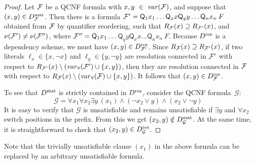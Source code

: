 \documentclass{llncs}
\newcommand{\longversion}[1]{#1}
\newcommand{\GGG}{\mathcal{G}} \newcommand{\HHH}{\mathcal{H}}
\newcommand{\Dres}{D^{\text{\normalfont res}}}
\newcommand{\Dmat}{D^{\text{\normalfont mat}}}
\begin{document}
\longversion{\begin{proof}
  Let $\mathcal{F}$ be a QCNF formula with $x,y~\in~\mathit{var}(\mathcal{F})$, and suppose that
  $(x,y) \in \Dmat_{\FFF}$. Then there is a formula $\mathcal{F}' = \mathsf{Q}_1
  x_1 \dots \mathsf{Q}_x x \mathsf{Q}_y y \dots \mathsf{Q}_n x_n\:F$ obtained
  from $\mathcal{F}$ by quantifier reordering, such that $R_{\mathcal{F}}(x) \supseteq
  R_{\mathcal{F}'}(x)$, and $\nu(\mathcal{F}') \neq \nu(\mathcal{F}'')$, where $\mathcal{F}''=
  \mathsf{Q}_1 x_1 \dots$\hskip 0pt$ \mathsf{Q}_y y \mathsf{Q}_x x
  \dots$\hskip 0pt$ \mathsf{Q}_n x_n\:F$. Because $\Dres$ is a dependency
  scheme, we must have $(x,y) \in \Dres_{\FFF'}$. Since $R_{\mathcal{F}}(x)
  \supseteq R_{\mathcal{F}'}(x)$, if two literals $\ell_x \in \{x,\neg x\}$ and
  $\ell_y \in \{y, \neg y\}$ are resolution connected in $\mathcal{F}'$ with respect
  to $R_{\mathcal{F}'}(x) \setminus (\mathit{var}_{\forall}(\mathcal{F}') \cup \{x,y\})$, then they
  are resolution connected in $\mathcal{F}$ with respect to $R_{\mathcal{F}}(x) \setminus
  (\mathit{var}_{\forall}(\mathcal{F}) \cup \{x,y\})$. It follows that $(x,y) \in
  \Dres_{\FFF}$.

  To see that $\Dmat$ is strictly contained in $\Dres$, consider the QCNF
  formula~$\GGG$:
  \[\GGG = \forall x_1 \forall x_2 \exists y\: (x_1) \wedge (\neg x_2 \vee y)
  \wedge (x_2 \vee \neg y) \] It is easy to verify that $\GGG$ is
  unsatisfiable and remains unsatisfiable if $\exists y$ and $ \forall x_2$
  switch positions in the prefix. From this we get $(x_2,y) \notin
  \Dmat_{\GGG}$. At the same time, it is straightforward to check that
  $(x_2,y) \in \Dres_{\GGG}$.
\end{proof}
 } 

\longversion{Note that the trivially unsatisfiable clause $(x_1)$ in the above
  formula can be replaced by an arbitrary unsatisfiable formula.}
\end{document}
